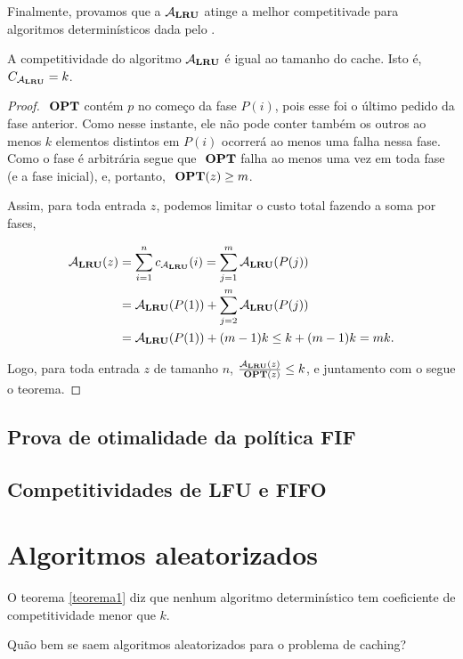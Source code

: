 Finalmente, provamos que a \(\mathcal{A}_{\mathbf{LRU}}\) atinge a melhor competitivade para algoritmos determinísticos dada pelo .

\begin{theorem}
  A competitividade do algoritmo \(\mathcal{A}_{\mathbf{LRU}}\) é igual ao tamanho do cache. Isto é, \(C_{\mathcal{A}_{\mathbf{LRU}}} = k\).
\end{theorem}

\begin{proof}
      \(\ \textbf{OPT}\) contém \(p\) no começo da fase \(P(i)\), pois esse foi o último pedido da fase anterior. Como nesse instante, ele não pode conter também os outros ao menos \(k\) elementos distintos em \(P(i)\) ocorrerá ao menos uma falha nessa fase. Como o fase é arbitrária segue que \(\ \textbf{OPT}\) falha ao menos uma vez em toda fase (e a fase inicial), e, portanto, \(\ \textbf{OPT}(z) \ge m\).

  Assim, para toda entrada \(z\), podemos limitar o custo total fazendo a soma por fases,

    \begin{align*}
    \mathcal{A}_{\mathbf{LRU}}(z) 
    &= \sum_{i=1}^n c_{\mathcal{A}_{\mathbf{LRU}}}(i) = \sum_{j=1}^m \mathcal{A}_{\mathbf{LRU}}(P(j)) 
    \\
    &= \mathcal{A}_{\mathbf{LRU}}(P(1)) + \sum_{j=2}^m \mathcal{A}_{\mathbf{LRU}}(P(j))
    \\
    &= \mathcal{A}_{\mathbf{LRU}}(P(1)) + (m-1)k \le k + (m-1)k = mk.
    \end{align*}

  Logo, para toda entrada \(z\) de tamanho \(n\), \(\frac{\mathcal{A}_{\mathbf{LRU}}(z)}{\ \textbf{OPT}(z)} \le k\), e juntamento com o  segue o teorema.
\end{proof}

\subsection{Prova de otimalidade da política \textbf{FIF}}

\subsection{Competitividades de \textbf{LFU} e \textbf{FIFO}}

\section{Algoritmos aleatorizados}

O teorema \ref{teorema1} diz que nenhum algoritmo determinístico tem coeficiente de competitividade menor que \(k\). 

Quão bem se saem algoritmos aleatorizados para o problema de caching?

